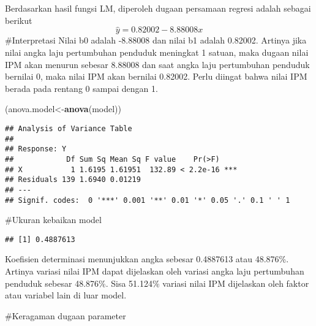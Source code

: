 \documentclass[
]{article}
\newenvironment{Shaded}{\begin{snugshade}}{\end{snugshade}}
\newcommand{\AttributeTok}[1]{\textcolor[rgb]{0.13,0.29,0.53}{#1}}
\newcommand{\DecValTok}[1]{\textcolor[rgb]{0.00,0.00,0.81}{#1}}
\newcommand{\FunctionTok}[1]{\textcolor[rgb]{0.13,0.29,0.53}{\textbf{#1}}}
\newcommand{\NormalTok}[1]{#1}
\newcommand{\OtherTok}[1]{\textcolor[rgb]{0.56,0.35,0.01}{#1}}
\newcommand{\SpecialCharTok}[1]{\textcolor[rgb]{0.81,0.36,0.00}{\textbf{#1}}}
\newcommand{\StringTok}[1]{\textcolor[rgb]{0.31,0.60,0.02}{#1}}
\begin{document}
Berdasarkan hasil fungsi LM, diperoleh dugaan persamaan regresi adalah
sebagai berikut \[\hat{y}=0.82002-8.88008{x}\] \#Interpretasi Nilai b0
adalah -8.88008 dan nilai b1 adalah 0.82002. Artinya jika nilai angka
laju pertumbuhan penduduk meningkat 1 satuan, maka dugaan nilai IPM akan
menurun sebesar 8.88008 dan saat angka laju pertumbuhan penduduk
bernilai 0, maka nilai IPM akan bernilai 0.82002. Perlu diingat bahwa
nilai IPM berada pada rentang 0 sampai dengan 1.

\begin{Shaded}
\begin{Highlighting}[]
\NormalTok{(anova.model}\OtherTok{\textless{}{-}}\FunctionTok{anova}\NormalTok{(model))}
\end{Highlighting}
\end{Shaded}

\begin{verbatim}
## Analysis of Variance Table
## 
## Response: Y
##            Df Sum Sq Mean Sq F value    Pr(>F)    
## X           1 1.6195 1.61951  132.89 < 2.2e-16 ***
## Residuals 139 1.6940 0.01219                      
## ---
## Signif. codes:  0 '***' 0.001 '**' 0.01 '*' 0.05 '.' 0.1 ' ' 1
\end{verbatim}

\#Ukuran kebaikan model

\begin{Shaded}
\end{Shaded}

\begin{verbatim}
## [1] 0.4887613
\end{verbatim}

Koefisien determinasi menunjukkan angka sebesar 0.4887613 atau 48.876\%.
Artinya variasi nilai IPM dapat dijelaskan oleh variasi angka laju
pertumbuhan penduduk sebesar 48.876\%. Sisa 51.124\% variasi nilai IPM
dijelaskan oleh faktor atau variabel lain di luar model.

\#Keragaman dugaan parameter
\end{document}
